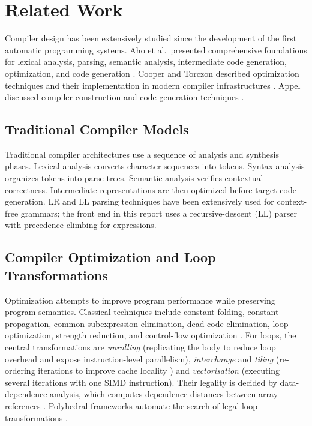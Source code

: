\newpage

\section{Related Work}

Compiler design has been extensively studied since the development of the
first automatic programming systems. Aho et al.\ presented comprehensive
foundations for lexical analysis, parsing, semantic analysis, intermediate
code generation, optimization, and code generation \cite{aho2006}. Cooper and
Torczon described optimization techniques and their implementation in modern
compiler infrastructures \cite{cooper2007}. Appel discussed compiler
construction and code generation techniques \cite{appel2004}.

\subsection{Traditional Compiler Models}

Traditional compiler architectures use a sequence of analysis and
synthesis phases. Lexical analysis converts character sequences into tokens.
Syntax analysis organizes tokens into parse trees. Semantic analysis verifies
contextual correctness. Intermediate representations are then optimized before
target-code generation. LR and LL parsing techniques have been extensively used
for context-free grammars; the front end in this report uses a recursive-descent
(LL) parser with precedence climbing for expressions.

\subsection{Compiler Optimization and Loop Transformations}

Optimization attempts to improve program performance while preserving
program semantics. Classical techniques include constant folding, constant
propagation, common subexpression elimination, dead-code elimination, loop
optimization, strength reduction, and control-flow optimization
\cite{muchnick1997}. For loops, the central transformations are
\emph{unrolling} (replicating the body to reduce loop overhead and expose
instruction-level parallelism), \emph{interchange} and \emph{tiling}
(re-ordering iterations to improve cache locality \cite{wolf1991}) and
\emph{vectorisation} (executing several iterations with one SIMD instruction).
Their legality is decided by data-dependence analysis, which computes
dependence distances between array references \cite{allen2002,bacon1994}.
Polyhedral frameworks automate the search of legal loop transformations
\cite{bondhugula2008}.

